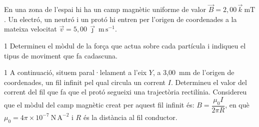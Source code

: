En una zona de l'espai hi ha un camp magnètic uniforme de valor $\vec{B} = 2,00\,\vec{k}\ \mathrm{mT}$. Un electró, un neutró i un protó hi entren per l'origen de coordenades a la mateixa velocitat $\vec{v} = 5,00\,\vec{\jmath}\ \mathrm{m\,s^{-1}}$.

\begin{apartat}{1}
Determineu el mòdul de la força que actua sobre cada partícula i indiqueu el tipus de moviment que fa cadascuna.
\end{apartat}

\begin{apartat}{1}
A continuació, situem paral·lelament a l'eix $Y$, a 3,00~mm de l'origen de coordenades, un fil infinit pel qual circula un corrent $I$. Determineu el valor del corrent del fil que fa que el protó segueixi una trajectòria rectilínia. Considereu que el mòdul del camp magnètic creat per aquest fil infinit és: $B = \dfrac{\mu_0 I}{2\pi R}$, en què $\mu_0 = 4\pi\times 10^{-7}\ \mathrm{N\,A^{-2}}$ i $R$ és la distància al fil conductor.
\end{apartat}

